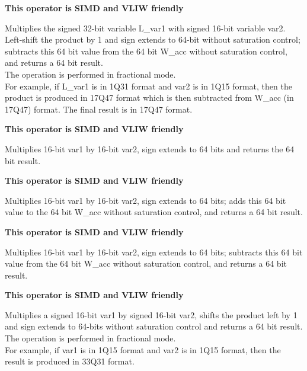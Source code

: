 
\textbf{ This operator is SIMD and VLIW friendly}

Multiplies the signed 32-bit variable L\_var1 with signed 16-bit variable var2.
Left-shift the product by 1 and sign extends to 64-bit without saturation control; subtracts this 64 bit value from the 64 bit W\_acc without saturation control, and returns a 64 bit result.\\
The operation is performed in fractional mode.\\
For example, if L\_var1 is in 1Q31 format and var2 is in 1Q15 format, then the product is produced in 17Q47 format which is then subtracted from W\_acc (in 17Q47) format.
The final result is in 17Q47 format.


\textbf{ This operator is SIMD and VLIW friendly}

Multiplies 16-bit var1 by 16-bit var2, sign extends to 64 bits and returns the 64 bit result.


\textbf{ This operator is SIMD and VLIW friendly}

Multiplies 16-bit var1 by 16-bit var2, sign extends to 64 bits; adds this 64 bit value to the 64 bit W\_acc without saturation control, and returns a 64 bit result.


\textbf{ This operator is SIMD and VLIW friendly}

Multiplies 16-bit var1 by 16-bit var2, sign extends to 64 bits; subtracts this 64 bit value from the 64 bit W\_acc without saturation control, and returns a 64 bit result.


\textbf{ This operator is SIMD and VLIW friendly}

Multiplies a signed 16-bit var1 by signed 16-bit var2, shifts the product left by 1 and sign extends to 64-bits without saturation control and returns a 64 bit result.\\
The operation is performed in fractional mode.\\
For example, if var1 is in 1Q15 format and var2 is in 1Q15 format, then the result is produced in 33Q31 format.

